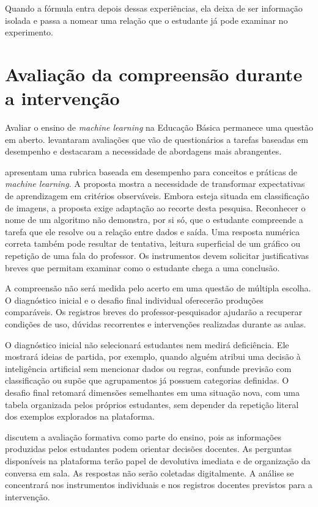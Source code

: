 Quando a fórmula entra depois dessas experiências, ela deixa de ser informação isolada e passa a nomear uma relação que o estudante já pode examinar no experimento.

\section{Avaliação da compreensão durante a intervenção}

Avaliar o ensino de \textit{machine learning} na Educação Básica permanece uma questão em aberto.  levantaram avaliações que vão de questionários a tarefas baseadas em desempenho e destacaram a necessidade de abordagens mais abrangentes.

 apresentam uma rubrica baseada em desempenho para conceitos e práticas de \textit{machine learning}. A proposta mostra a necessidade de transformar expectativas de aprendizagem em critérios observáveis. Embora esteja situada em classificação de imagens, a proposta exige adaptação ao recorte desta pesquisa. Reconhecer o nome de um algoritmo não demonstra, por si só, que o estudante compreende a tarefa que ele resolve ou a relação entre dados e saída. Uma resposta numérica correta também pode resultar de tentativa, leitura superficial de um gráfico ou repetição de uma fala do professor. Os instrumentos devem solicitar justificativas breves que permitam examinar como o estudante chega a uma conclusão.

A compreensão não será medida pelo acerto em uma questão de múltipla escolha. O diagnóstico inicial e o desafio final individual oferecerão produções comparáveis. Os registros breves do professor-pesquisador ajudarão a recuperar condições de uso, dúvidas recorrentes e intervenções realizadas durante as aulas.

O diagnóstico inicial não selecionará estudantes nem medirá deficiência. Ele mostrará ideias de partida, por exemplo, quando alguém atribui uma decisão à inteligência artificial sem mencionar dados ou regras, confunde previsão com classificação ou supõe que agrupamentos já possuem categorias definidas. O desafio final retomará dimensões semelhantes em uma situação nova, com uma tabela organizada pelos próprios estudantes, sem depender da repetição literal dos exemplos explorados na plataforma.

 discutem a avaliação formativa como parte do ensino, pois as informações produzidas pelos estudantes podem orientar decisões docentes. As perguntas disponíveis na plataforma terão papel de devolutiva imediata e de organização da conversa em sala. As respostas não serão coletadas digitalmente. A análise se concentrará nos instrumentos individuais e nos registros docentes previstos para a intervenção.

